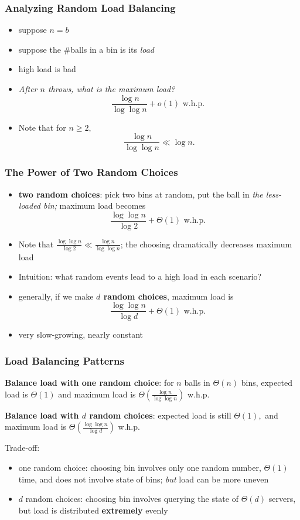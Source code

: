 \documentclass[10pt,aspectratio=169]{beamer}
\begin{document}
\begin{frame} \frametitle{Analyzing Random Load Balancing}
\begin{itemize}
  \item suppose $n=b$
  \item suppose the \#balls in a bin is its \emph{load}
  \item high load is bad
  \item \emph{After $n$ throws, what is the maximum load?}
    \[ \frac{\log n}{\log \log n} + o(1) \text{ w.h.p. } \]
  \item Note that for $n \geq 2,$
    \[ \frac{\log n}{\log \log n} \ll \log n . \]
\end{itemize}
\end{frame}

\begin{frame} \frametitle{The Power of Two Random Choices}
\begin{itemize}
  \item \textbf{two random choices}: pick two bins at random, put the ball in
    \emph{the less-loaded bin;} maximum load becomes
    \[ \frac{\log \log n}{\log 2} + \Theta(1) \text{ w.h.p. } \]
  \item Note that $\frac{\log \log n}{\log 2} \ll \frac{\log n}{\log \log n}$; the choosing dramatically decreases maximum load
  \item Intuition: what random events lead to a high load in each scenario?
  \item generally, if we make \textbf{$d$ random choices}, maximum load is
    \[ \frac{\log \log n}{\log d} + \Theta(1) \text { w.h.p. } \]
  \item very slow-growing, nearly constant
\end{itemize}
\end{frame}

\begin{frame} \frametitle{Load Balancing Patterns}

\textbf{Balance load with one random choice}: for $n$ balls in $\Theta(n)$ bins,
expected load is $\Theta(1)$ and maximum load is $\Theta(\frac{\log n}{\log \log n})$ w.h.p.
\vspace{.5cm}

\textbf{Balance load with $d$ random choices}: expected load is still $\Theta(1),$
and maximum load is $\Theta(\frac{\log \log n}{\log d})$ w.h.p.
\vspace{.5cm}

Trade-off:
\begin{itemize}
  \item one random choice: choosing bin involves only one random number,
  $\Theta(1)$ time, and
    does not involve state of bins; \emph{but} load can be more uneven
  \item $d$ random choices: choosing bin involves querying the state of $\Theta(d)$ servers, but
  load is distributed \textbf{extremely} evenly
\end{itemize}
\end{frame}
\end{document}
